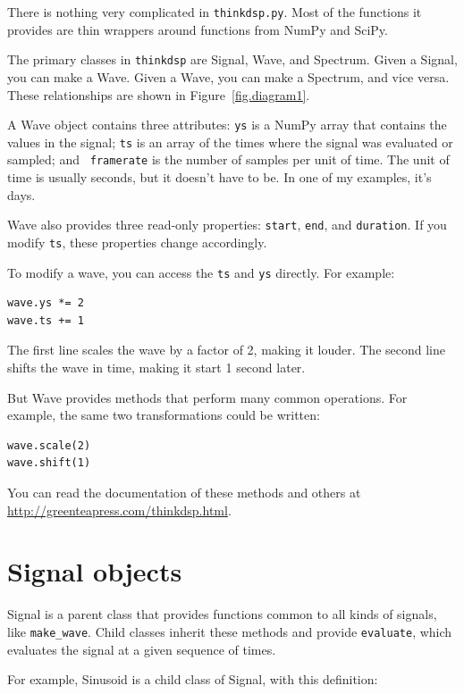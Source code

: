 \documentclass[12pt]{book}
\begin{document}
There is nothing very complicated in {\tt thinkdsp.py}.  Most
of the functions it provides are thin wrappers around functions
from NumPy and SciPy.

The primary classes in {\tt thinkdsp} are Signal, Wave, and Spectrum.
Given a Signal, you can make a Wave.  Given a Wave, you can
make a Spectrum, and vice versa.  These relationships are shown
in Figure~\ref{fig.diagram1}.

A Wave object contains three attributes: {\tt ys} is a NumPy array
that contains the values in the signal; {\tt ts} is an array of the
times where the signal was evaluated or sampled; and {\tt
  framerate} is the number of samples per unit of time.  The
unit of time is usually seconds, but it doesn't have to be.  In
one of my examples, it's days.

Wave also provides three read-only properties: {\tt start},
{\tt end}, and {\tt duration}.  If you modify {\tt ts}, these
properties change accordingly.

To modify a wave, you can access the {\tt ts} and {\tt ys} directly.
For example:

\begin{verbatim}
wave.ys *= 2
wave.ts += 1
\end{verbatim}

The first line scales the wave by a factor of 2, making
it louder.  The second line shifts the wave in time, making it
start 1 second later.

But Wave provides methods that perform many common operations.
For example, the same two transformations could be written:

\begin{verbatim}
wave.scale(2)
wave.shift(1)
\end{verbatim}

You can read the documentation of these methods and others at
\url{http://greenteapress.com/thinkdsp.html}.


\section{Signal objects}
\label{sigobs}

Signal is a parent class that provides functions common to all
kinds of signals, like \verb"make_wave".  Child classes inherit
these methods and provide {\tt evaluate}, which evaluates the
signal at a given sequence of times.

For example, Sinusoid is a child class of Signal, with this
definition:
\end{document}
